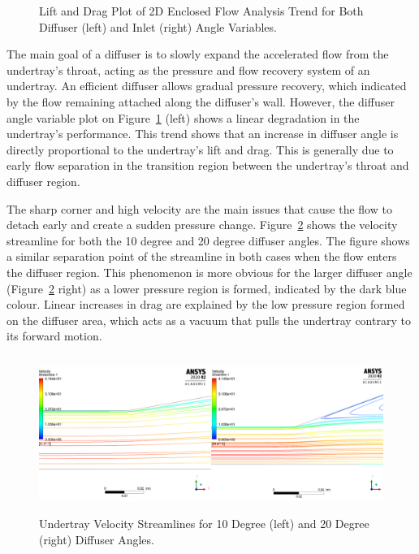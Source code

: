 \begin{figure}[!ht]
  \noindent
  \caption{Lift and Drag Plot of 2D Enclosed Flow Analysis Trend for Both Diffuser (left) and Inlet (right) Angle Variables.}
  \label{fig:2D_EN_result}
\end{figure}

\noindent The main goal of a diffuser is to slowly expand the accelerated flow from the undertray's throat, acting as the pressure and flow recovery system of an undertray. An efficient diffuser allows gradual pressure recovery, which indicated by the flow remaining attached along the diffuser's wall. However, the diffuser angle variable plot on Figure~\ref{fig:2D_EN_result} (left) shows a linear degradation in the undertray's performance. This trend shows that an increase in diffuser angle is directly proportional to the undertray's lift and drag. This is generally due to early flow separation in the transition region between the undertray's throat and diffuser region. 

\noindent The sharp corner and high velocity are the main issues that cause the flow to detach early and create a sudden pressure change. Figure~\ref{fig:2D_EN_streamline_compare} shows the velocity streamline for both the 10 degree and 20 degree diffuser angles. The figure shows a similar separation point of the streamline in both cases when the flow enters the diffuser region. This phenomenon is more obvious for the larger diffuser angle (Figure~\ref{fig:2D_EN_streamline_compare} right) as a lower pressure region is formed, indicated by the dark blue colour. Linear increases in drag are explained by the low pressure region formed on the diffuser area, which acts as a vacuum that pulls the undertray contrary to its forward motion.  

\begin{figure}[!ht]
    \centering
    \includegraphics[height= 5.1cm]{Figures/2D_EN/2D_EN_Streamline_compare.PNG}
    \caption{Undertray Velocity Streamlines for 10 Degree (left) and 20 Degree (right) Diffuser Angles.}
    \label{fig:2D_EN_streamline_compare}
\end{figure}

